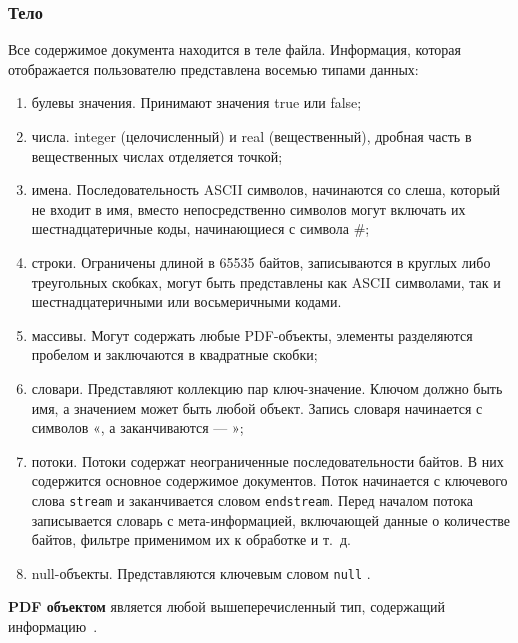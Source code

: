 \subsubsection{Тело}
Все содержимое документа находится в теле файла. Информация, которая отображается пользователю представлена восемью типами данных:
\begin{enumerate}
	\item булевы значения. Принимают значения true или false;
	\item числа. integer (целочисленный) и real (вещественный), дробная часть в вещественных числах отделяется точкой;
	\item имена. Последовательность ASCII символов, начинаются со слеша, который не входит в имя, вместо непосредственно символов могут включать их шестнадцатеричные коды, начинающиеся с символа \#;
	\item строки. Ограничены длиной в 65535 байтов, записываются в круглых либо треугольных скобках, могут быть представлены как ASCII символами, так и шестнадцатеричными или восьмеричными кодами.
	\item массивы. Могут содержать любые PDF-объекты, элементы разделяются пробелом и заключаются в квадратные скобки;
	\item словари. Представляют коллекцию пар ключ-значение. Ключом должно быть имя, а значением может быть любой объект. Запись словаря начинается с символов «, а заканчиваются — »;
	\item потоки. Потоки содержат неограниченные последовательности байтов. В них содержится основное содержимое документов. Поток начинается с ключевого слова \texttt{stream} и заканчивается словом \texttt{endstream}. Перед началом потока записывается словарь с мета-информацией, включающей данные о количестве байтов, фильтре применимом их к обработке и т.~д.
	\item null-объекты. Представляются ключевым словом \texttt{null} \cite{pdf_object_def}.
\end{enumerate}
\textbf{PDF объектом} является любой вышеперечисленный тип, содержащий информацию~\cite{pdf_object_def}.



